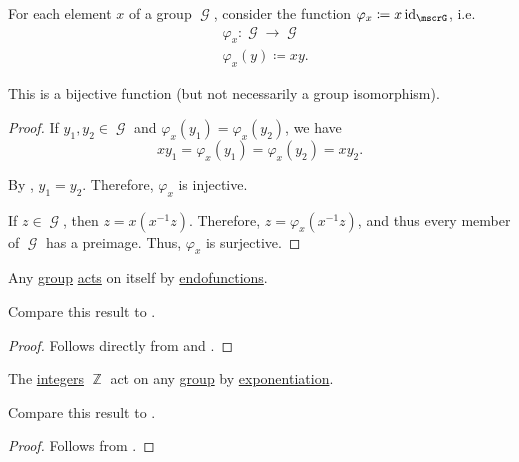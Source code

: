 \begin{lemma}\label{thm:group_multiplication_is_bijection}
  For each element \( x \) of a group \( \mscrG \), consider the function \( \varphi_x \coloneqq x \id_\mscrG \), i.e.
  \begin{equation*}
    \begin{aligned}
      &\varphi_x: \mscrG \to \mscrG \\
      &\varphi_x(y) \coloneqq xy.
    \end{aligned}
  \end{equation*}

  This is a bijective function (but not necessarily a group isomorphism).
\end{lemma}
\begin{proof}
   If \( y_1, y_2 \in \mscrG \) and \( \varphi_x(y_1) = \varphi_x(y_2) \), we have
  \begin{equation*}
    xy_1 = \varphi_x(y_1) = \varphi_x(y_2) = xy_2.
  \end{equation*}

  By , \( y_1 = y_2 \). Therefore, \( \varphi_x \) is injective.

   If \( z \in \mscrG \), then \( z = x(x^{-1} z) \). Therefore, \( z = \varphi_x(x^{-1} z) \), and thus every member of \( \mscrG \) has a preimage. Thus, \( \varphi_x \) is surjective.
\end{proof}

\begin{theorem}\label{thm:cayleys_theorem}
  Any \hyperref[def:group]{group} \hyperref[def:group_action]{acts} on itself by \hyperref[def:multi_valued_function/endofunction]{endofunctions}.

  Compare this result to .
\end{theorem}
\begin{proof}
  Follows directly from  and .
\end{proof}

\begin{proposition}\label{thm:integers_group_action}
  The \hyperref[def:set_of_integers]{integers} \( \BbbZ \) act on any \hyperref[def:group]{group} by \hyperref[def:group/exponentiation]{exponentiation}.

  Compare this result to .
\end{proposition}
\begin{proof}
  Follows from .
\end{proof}
